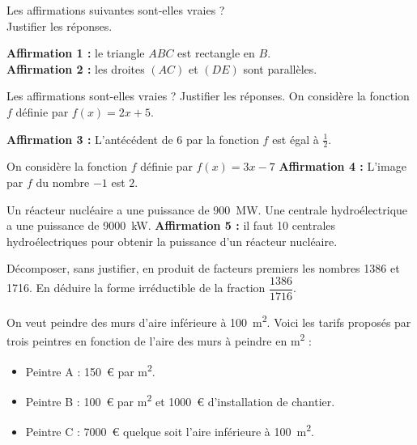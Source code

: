 \documentclass[11pt]{memoir}
\begin{document}
\begin{questions}
\noindent Les affirmations suivantes sont-elles vraies ?\\
Justifier les réponses.

\vspace{1em}

\textbf{Affirmation 1 : } le triangle $ABC$ est rectangle en $B$.\\
\textbf{Affirmation 2 : } les droites $(AC)$ et $(DE)$ sont parallèles.

\begin{center}
\end{center}

\exercice[9]
Les affirmations sont-elles vraies ? Justifier les réponses.
On considère la fonction $f$ définie par $f(x) = 2x+5$.

\textbf{Affirmation 3 :} L'antécédent de 6 par la fonction $f$ est égal à $\frac{1}{2}$.

On considère la fonction $f$ définie par $f(x) = 3x-7$
\textbf{Affirmation 4 :} L'image par $f$ du nombre $-1$ est $2$.

Un réacteur nucléaire a une puissance de \qty{900}{MW}.
Une centrale hydroélectrique a une puissance de \qty{9000}{kW}.
\textbf{Affirmation 5 :} il faut 10 centrales hydroélectriques pour obtenir la puissance d'un réacteur nucléaire.

\exercice[10]
\question Décomposer, sans justifier, en produit de facteurs premiers les nombres \num{1386} et \num{1716}.
\question En déduire la forme irréductible de la fraction $\dfrac{1386}{1716}$.

\exercice[25]
On veut peindre des murs d'aire inférieure à \qty{100}{m\squared}.
Voici les tarifs proposés par trois peintres en fonction de l'aire des murs à peindre en \unit{m\squared} :
\begin{itemize}
    \item Peintre A : \qty{150}{€} par \unit{\meter\squared}.
    \item Peintre B : \qty{100}{€} par \unit{\meter\squared} et \qty{1000}{€} d'installation de chantier.
    \item Peintre C : \qty{7000}{€} quelque soit l'aire inférieure à \qty{100}{\meter\squared}.
\end{itemize}


\end{questions}
\end{document}
